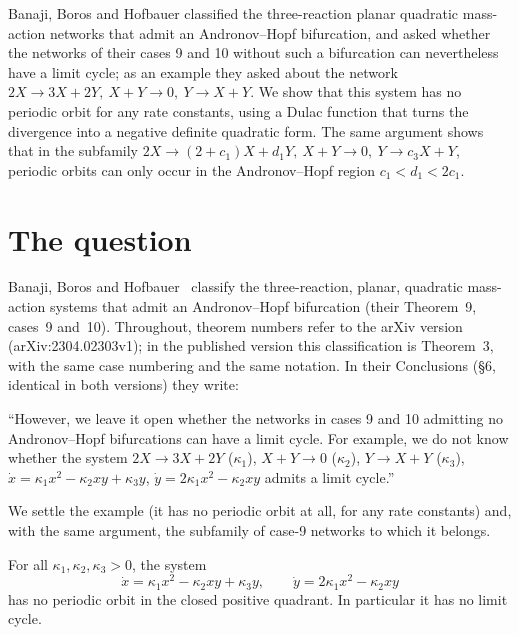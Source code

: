 \documentclass[11pt,a4paper]{report}
\begin{document}
\makepapertitle

\begin{paperabstract}
Banaji, Boros and Hofbauer classified the three-reaction planar quadratic mass-action networks that admit an
Andronov--Hopf bifurcation, and asked whether the networks of their cases 9 and 10 without such a bifurcation can
nevertheless have a limit cycle; as an example they asked about the network
\(2X\to3X+2Y,\ X+Y\to0,\ Y\to X+Y\). We show that this system has no periodic orbit for any rate constants, using a
Dulac function that turns the divergence into a negative definite quadratic form. The same argument shows that in
the subfamily \(2X\to(2+c_1)X+d_1Y,\ X+Y\to0,\ Y\to c_3X+Y\), periodic orbits can only occur in the
Andronov--Hopf region \(c_1<d_1<2c_1\).
\end{paperabstract}

\section*{The question}

Banaji, Boros and Hofbauer~\autocite{BBH2024} classify the three-reaction, planar, quadratic mass-action systems that
admit an Andronov--Hopf bifurcation (their Theorem~9, cases~9 and~10). Throughout, theorem numbers refer to the arXiv
version (arXiv:2304.02303v1); in the published version this classification is Theorem~3, with the same case numbering
and the same notation. In their Conclusions (§6, identical in both versions) they write:

\begin{openquote}
``However, we leave it open whether the networks in cases 9 and 10 admitting no Andronov--Hopf bifurcations can
have a limit cycle. For example, we do not know whether the system \(2X\to3X+2Y\) (\(\kappa_1\)), \(X+Y\to0\)
(\(\kappa_2\)), \(Y\to X+Y\) (\(\kappa_3\)), \(\dot x=\kappa_1x^2-\kappa_2xy+\kappa_3y\),
\(\dot y=2\kappa_1x^2-\kappa_2xy\) admits a limit cycle.''
\end{openquote}

We settle the example (it has no periodic orbit at all, for any rate constants) and, with the same argument, the
subfamily of case-9 networks to which it belongs.

\begin{theorem}\label{thm:example}
For all \(\kappa_1,\kappa_2,\kappa_3>0\), the system
\[
\dot x=\kappa_1x^2-\kappa_2xy+\kappa_3y,\qquad \dot y=2\kappa_1x^2-\kappa_2xy
\]
has no periodic orbit in the closed positive quadrant. In particular it has no limit cycle.
\end{theorem}
\end{document}

